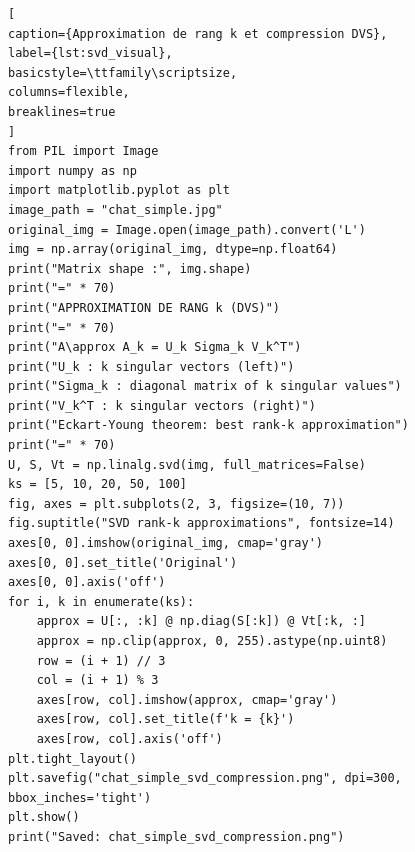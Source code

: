 \documentclass[12pt]{report}
\begin{document}
\begin{lstlisting}[
caption={Approximation de rang k et compression DVS},
label={lst:svd_visual},
basicstyle=\ttfamily\scriptsize,
columns=flexible,
breaklines=true
]
from PIL import Image
import numpy as np
import matplotlib.pyplot as plt
image_path = "chat_simple.jpg"
original_img = Image.open(image_path).convert('L')
img = np.array(original_img, dtype=np.float64)
print("Matrix shape :", img.shape)
print("=" * 70)
print("APPROXIMATION DE RANG k (DVS)")
print("=" * 70)
print("A\approx A_k = U_k Sigma_k V_k^T")
print("U_k : k singular vectors (left)")
print("Sigma_k : diagonal matrix of k singular values")
print("V_k^T : k singular vectors (right)")
print("Eckart-Young theorem: best rank-k approximation")
print("=" * 70)
U, S, Vt = np.linalg.svd(img, full_matrices=False)
ks = [5, 10, 20, 50, 100]
fig, axes = plt.subplots(2, 3, figsize=(10, 7))
fig.suptitle("SVD rank-k approximations", fontsize=14)
axes[0, 0].imshow(original_img, cmap='gray')
axes[0, 0].set_title('Original')
axes[0, 0].axis('off')
for i, k in enumerate(ks):
    approx = U[:, :k] @ np.diag(S[:k]) @ Vt[:k, :]
    approx = np.clip(approx, 0, 255).astype(np.uint8)
    row = (i + 1) // 3
    col = (i + 1) % 3
    axes[row, col].imshow(approx, cmap='gray')
    axes[row, col].set_title(f'k = {k}')
    axes[row, col].axis('off')
plt.tight_layout()
plt.savefig("chat_simple_svd_compression.png", dpi=300, bbox_inches='tight')
plt.show()
print("Saved: chat_simple_svd_compression.png")
\end{lstlisting}
\end{document}
